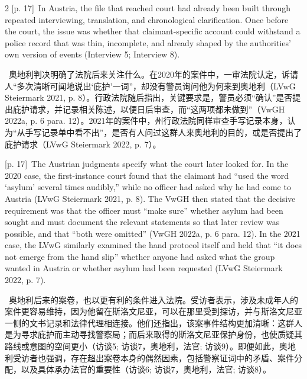 \documentclass[10pt,a4paper]{article}
\begin{document}
\begin{paracol}{2}
\switchcolumn
{\scriptsize\color{gray} [p. 17]}\ In Austria, the file that reached court had already been built through repeated interviewing, translation, and chronological clarification. Once before the court, the issue was whether that claimant-specific account could withstand a police record that was thin, incomplete, and already shaped by the authorities’ own version of events (Interview 5; Interview 8).\par
\switchcolumn*
{\scriptsize\color{gray} [p. 17]}\ 奥地利判决明确了法院后来关注什么。在2020年的案件中，一审法院认定，诉请人“多次清晰可闻地说出‘庇护’一词”，却没有警员询问他为何来到奥地利（LVwG Steiermark 2021, p. 8）。行政法院随后指出，关键要求是，警员必须“确认”是否提出庇护请求，并记录相关陈述，以便日后审查，而“这两项都未做到”（VwGH 2022a, p. 6 para. 12）。2021年的案件中，州行政法院同样审查手写记录本身，认为“从手写记录单中看不出”，是否有人问过这群人来奥地利的目的，或是否提出了庇护请求（LVwG Steiermark 2022, p. 7）。\par
\switchcolumn
{\scriptsize\color{gray} [p. 17]}\ The Austrian judgments specify what the court later looked for. In the 2020 case, the first-instance court found that the claimant had “used the word ‘asylum’ several times audibly,” while no officer had asked why he had come to Austria (LVwG Steiermark 2021, p. 8). The VwGH then stated that the decisive requirement was that the officer must “make sure” whether asylum had been sought and must document the relevant statements so that later review was possible, and that “both were omitted” (VwGH 2022a, p. 6 para. 12). In the 2021 case, the LVwG similarly examined the hand protocol itself and held that “it does not emerge from the hand slip” whether anyone had asked what the group wanted in Austria or whether asylum had been requested (LVwG Steiermark 2022, p. 7).\par
\switchcolumn*
{\scriptsize\color{gray} [p. 17]}\ 奥地利后来的案卷，也以更有利的条件进入法院。受访者表示，涉及未成年人的案件更容易维持，因为他留在斯洛文尼亚，可以在那里受到探访，并与斯洛文尼亚一侧的文书记录和法律代理相连接。他们还指出，该案事件结构更加清晰：这群人是为寻求庇护而主动寻找警察局；而后来取得的斯洛文尼亚保护身份，也使质疑其路线或意图的空间更小（访谈5; 访谈7，奥地利，法官; 访谈9）。即便如此，奥地利受访者也强调，存在超出案卷本身的偶然因素，包括警察证词中的矛盾、案件分配，以及具体承办法官的重要性（访谈6; 访谈7，奥地利，法官; 访谈8）。\par
\switchcolumn

\end{paracol}
\end{document}
